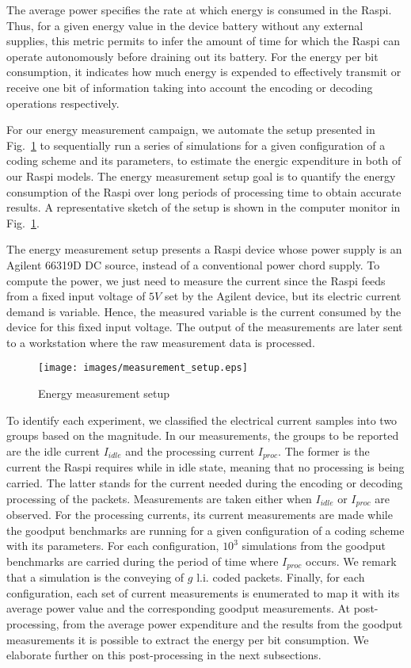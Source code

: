 The average power specifies the rate at which energy is
consumed in the \ac{Raspi}. Thus, for a given energy value in the device
battery without any external supplies, this metric permits to infer the amount
of time for which the \ac{Raspi} can operate autonomously before draining
out its battery. For the energy per bit consumption, it indicates how
much energy is expended to effectively transmit or receive one bit of
information taking into account the encoding or decoding operations
respectively.

For our energy measurement campaign, we automate the setup presented
in Fig.~\ref{fig:measurement_setup} to sequentially run a series of
simulations for a given configuration of a coding scheme and its parameters,
to estimate the energic expenditure in both of our \ac{Raspi}
models. The energy measurement setup goal is to quantify the energy
consumption of the \ac{Raspi} over long periods of processing time to
obtain accurate results. A representative sketch of the setup is shown
in the computer monitor in Fig.~\ref{fig:measurement_setup}.

The energy measurement setup presents a \ac{Raspi} device whose power
supply is an Agilent 66319D \ac{DC} source, instead of a conventional
power chord supply.   To compute the power, we just need to measure
the current since the \ac{Raspi} feeds from a fixed input voltage of $5V$
set by the Agilent device, but its electric current demand is variable.
Hence, the measured variable is the current consumed by the device for
this fixed input voltage. The output of the measurements
are later sent to a workstation where the raw measurement data is processed.

\begin{figure}[ht!]
\centering
\texttt{[image: images/measurement\_setup.eps]}
\caption{Energy measurement setup}
\label{fig:measurement_setup}
\end{figure}

To identify each experiment, we classified the electrical current samples
into two groups based on the magnitude. In our measurements, the groups to
be reported are the idle current $I_{idle}$ and the processing current
$I_{proc}$. The former is the current the \ac{Raspi} requires while in idle
state, meaning that no processing is being carried. The latter stands for
the current needed during the encoding or decoding processing of the packets.
Measurements are taken either when $I_{idle}$ or $I_{proc}$ are observed.
For the processing currents, its current measurements are made while the
goodput benchmarks are running for a given configuration of a coding scheme
with its parameters. For each configuration, $10^3$ simulations from the
goodput benchmarks are carried during the period of time where $I_{proc}$
occurs. We remark that a simulation is the conveying of $g$ \ac{l.i.} coded
packets. Finally, for each configuration, each set of current measurements is
enumerated to map it with its average power value and the corresponding goodput
measurements. At post-processing, from the average power expenditure and the
results from the goodput measurements it is possible to extract the energy
per bit consumption. We elaborate further on this post-processing in the
next subsections.

